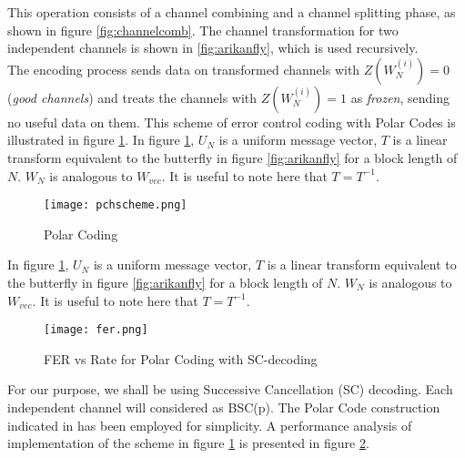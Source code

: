 \documentclass[
11pt, %
a4paper, %
oneside, %
headinclude,footinclude, %
BCOR5mm, %
]{scrartcl}
\begin{document}
This operation consists of a channel combining and a channel splitting phase, as shown in figure \ref{fig:channelcomb}. The channel transformation for two independent channels is shown in \ref{fig:arikanfly}, which is used recursively. \\The encoding process sends data on transformed channels with $Z(W^{(i)}_N)=0$  (\emph{good channels}) and treats the channels with $Z(W^{(i)}_N)=1$ as \emph{frozen}, sending no useful data on them. This scheme of error control coding with Polar Codes is illustrated in figure \ref{fig:pchscheme}.
In figure \ref{fig:pchscheme}, $U_N$ is a uniform message vector, $T$ is a linear transform equivalent to the butterfly in figure \ref{fig:arikanfly} for a block length of $N$. $W_N$ is analogous to $W_{vec}$. It is useful to note here that $T=T^{-1}$.
\begin{figure}[h!]
 \begin{center}
    \texttt{[image: pchscheme.png]}
  \end{center}
  \caption{Polar Coding}
  \label{fig:pchscheme}
\end{figure}
In figure \ref{fig:pchscheme}, $U_N$ is a uniform message vector, $T$ is a linear transform equivalent to the butterfly in figure \ref{fig:arikanfly} for a block length of $N$. $W_N$ is analogous to $W_{vec}$. It is useful to note here that $T=T^{-1}$.
\begin{figure}[h!]
  \begin{center}
    \texttt{[image: fer.png]}
  \end{center}
  \caption{FER vs Rate for Polar Coding with SC-decoding}
  \label{fig:fer}
\end{figure}
For our purpose, we shall be using Successive Cancellation (SC) decoding. Each independent channel will considered as BSC(p). The Polar Code construction indicated in \cite{zhang} has been employed for simplicity. A performance analysis of implementation of the scheme in figure \ref{fig:pchscheme} is presented in figure \ref{fig:fer}.   
\end{document}
